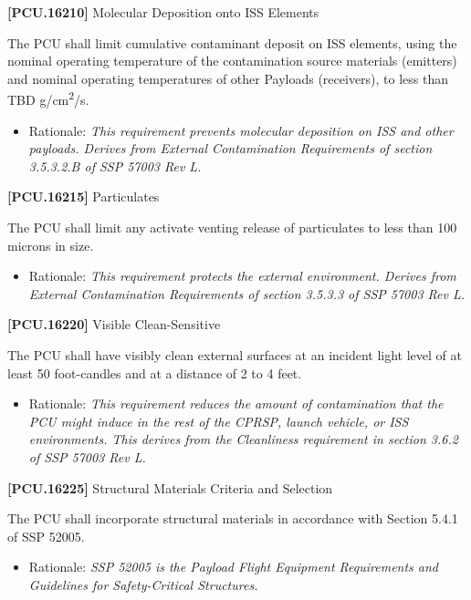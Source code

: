 \textbf{[PCU.16210]} Molecular Deposition onto \gls{ISS} Elements

The \gls{PCU} shall limit cumulative contaminant deposit on \gls{ISS} elements, using the nominal operating temperature of the contamination source materials (emitters) and nominal operating temperatures of other Payloads (receivers), to less than TBD\label{tbx_10} g\slash cm\textsuperscript{2}\slash s.

\begin{itemize}
\item{} Rationale: \emph{This requirement prevents molecular deposition on ISS and other payloads. Derives from External Contamination Requirements of section 3.5.3.2.B of SSP 57003 Rev L.}

\end{itemize}

\textbf{[PCU.16215]} Particulates

The \gls{PCU} shall limit any activate venting release of particulates to less than 100 microns in size.

\begin{itemize}
\item{} Rationale: \emph{This requirement protects the external environment. Derives from External Contamination Requirements of section 3.5.3.3 of SSP 57003 Rev L.}

\end{itemize}

\textbf{[PCU.16220]} Visible Clean-Sensitive

The \gls{PCU} shall have visibly clean external surfaces at an incident light level of at least 50 foot-candles and at a distance of 2 to 4 feet.

\begin{itemize}
\item{} Rationale: \emph{This requirement reduces the amount of contamination that the PCU might induce in the rest of the CPRSP, launch vehicle, or ISS environments. This derives from the Cleanliness requirement in section 3.6.2 of SSP 57003 Rev L.}

\end{itemize}

\textbf{[PCU.16225]} Structural Materials Criteria and Selection

The \gls{PCU} shall incorporate structural materials in accordance with Section 5.4.1 of SSP 52005.

\begin{itemize}
\item{} Rationale: \emph{SSP 52005 is the Payload Flight Equipment Requirements and Guidelines for Safety-Critical Structures.}

\end{itemize}

